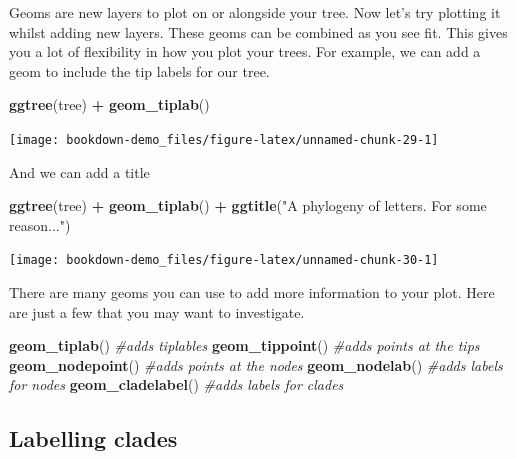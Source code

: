 \documentclass[
]{book}
\newenvironment{Shaded}{\begin{snugshade}}{\end{snugshade}}
\newcommand{\CommentTok}[1]{\textcolor[rgb]{0.56,0.35,0.01}{\textit{#1}}}
\newcommand{\KeywordTok}[1]{\textcolor[rgb]{0.13,0.29,0.53}{\textbf{#1}}}
\newcommand{\NormalTok}[1]{#1}
\newcommand{\OperatorTok}[1]{\textcolor[rgb]{0.81,0.36,0.00}{\textbf{#1}}}
\newcommand{\StringTok}[1]{\textcolor[rgb]{0.31,0.60,0.02}{#1}}
\begin{document}
Geoms are new layers to plot on or alongside your tree. Now let's try plotting it whilst adding new layers. These geoms can be combined as you see fit. This gives you a lot of flexibility in how you plot your trees. For example, we can add a geom to include the tip labels for our tree.

\begin{Shaded}
\begin{Highlighting}[]
\KeywordTok{ggtree}\NormalTok{(tree) }\OperatorTok{+}\StringTok{ }
\StringTok{  }\KeywordTok{geom\_tiplab}\NormalTok{()}
\end{Highlighting}
\end{Shaded}

\begin{center}\texttt{[image: bookdown-demo\_files/figure-latex/unnamed-chunk-29-1]} \end{center}

And we can add a title

\begin{Shaded}
\begin{Highlighting}[]
\KeywordTok{ggtree}\NormalTok{(tree) }\OperatorTok{+}\StringTok{ }
\StringTok{  }\KeywordTok{geom\_tiplab}\NormalTok{() }\OperatorTok{+}
\StringTok{  }\KeywordTok{ggtitle}\NormalTok{(}\StringTok{"A phylogeny of letters. For some reason..."}\NormalTok{)}
\end{Highlighting}
\end{Shaded}

\begin{center}\texttt{[image: bookdown-demo\_files/figure-latex/unnamed-chunk-30-1]} \end{center}

There are many geoms you can use to add more information to your plot. Here are just a few that you may want to investigate.

\begin{Shaded}
\begin{Highlighting}[]
\KeywordTok{geom\_tiplab}\NormalTok{() }\CommentTok{\#adds tiplables}
\KeywordTok{geom\_tippoint}\NormalTok{() }\CommentTok{\#adds points at the tips}
\KeywordTok{geom\_nodepoint}\NormalTok{() }\CommentTok{\#adds points at the nodes}
\KeywordTok{geom\_nodelab}\NormalTok{() }\CommentTok{\#adds labels for nodes}
\KeywordTok{geom\_cladelabel}\NormalTok{() }\CommentTok{\#adds labels for clades}
\end{Highlighting}
\end{Shaded}

\hypertarget{labelling-clades}{%
\subsection{Labelling clades}\label{labelling-clades}}
\end{document}
